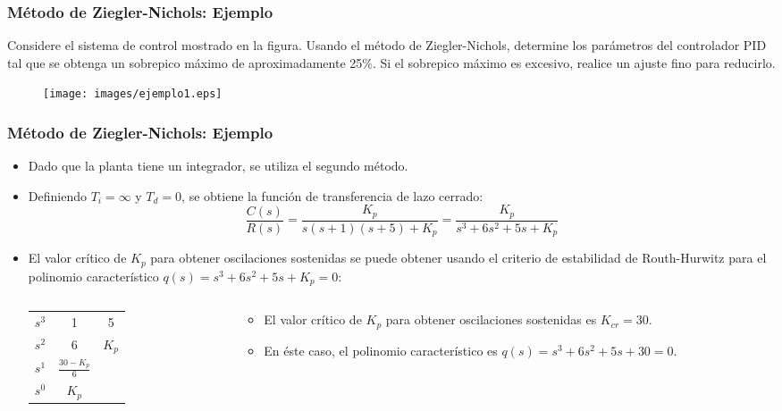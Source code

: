 \documentclass[aspectratio=169,handout]{beamer}
\theoremstyle{definition}
\theoremstyle{plain}
\theoremstyle{remark}
\begin{document}
\begin{frame}[<+->]\frametitle{Método de Ziegler-Nichols: Ejemplo}
Considere el sistema de control mostrado en la figura. Usando el método de Ziegler-Nichols, determine los parámetros del controlador PID tal que se obtenga un sobrepico máximo de aproximadamente 25\%. Si el sobrepico máximo es excesivo, realice un ajuste fino para reducirlo.
\begin{figure}
\texttt{[image: images/ejemplo1.eps]}
\end{figure}
\end{frame}

\begin{frame}[<+->]\frametitle{Método de Ziegler-Nichols: Ejemplo}
\begin{itemize}
	\item Dado que la planta tiene un integrador, se utiliza el segundo método.
	\item Definiendo $T_i = \infty$ y $T_d = 0$, se obtiene la función de transferencia de lazo cerrado:
	\begin{equation*}
		\frac{C(s)}{R(s)} = \frac{K_p}{s(s+1)(s+5) + K_p} = \frac{K_p}{s^3 + 6s^2 + 5s + K_p}
	\end{equation*}
	\item El valor crítico de $K_p$ para obtener oscilaciones sostenidas se puede obtener usando el criterio de estabilidad de Routh-Hurwitz para el polinomio característico $q(s) = s^3 + 6s^2 + 5s + K_p = 0$:
	\begin{columns}
	\begin{column}{0.4\textwidth}
		\begin{table}
		\begin{tabular}{c|cc}
			$s^3$ & 1 & 5\\
			$s^2$ & 6 & $K_p$\\
			$s^1$ & $\frac{30-K_p}{6}$ & \\
			$s^0$ & $K_p$ & 
		\end{tabular}
		\end{table}
	\end{column}	
	\begin{column}{0.6\textwidth}
		\begin{itemize}
			\item El valor crítico de $K_p$ para obtener oscilaciones sostenidas es $K_{cr} = 30$.
			\item En éste caso, el polinomio característico es $q(s) = s^3 + 6s^2 + 5s + 30 = 0$.
		\end{itemize}
	\end{column}	
	\end{columns}
\end{itemize}
\end{frame}
\end{document}
